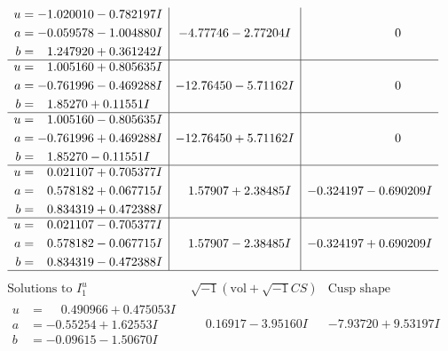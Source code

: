 \documentclass[1p]{elsarticle_modified}
\theoremstyle{definition}
\newcommand{\I}{\sqrt{-1}}
\begin{document}
$$\begin{array}{c|c|c}
\begin{aligned}
u &= -1.020010 - 0.782197 I \\
a &= -0.059578 - 1.004880 I \\
b &= \phantom{-}1.247920 + 0.361242 I\end{aligned}
 & -4.77746 - 2.77204 I & \phantom{-0.000000 } 0 \\ \hline\begin{aligned}
u &= \phantom{-}1.005160 + 0.805635 I \\
a &= -0.761996 - 0.469288 I \\
b &= \phantom{-}1.85270 + 0.11551 I\end{aligned}
 & -12.76450 - 5.71162 I & \phantom{-0.000000 } 0 \\ \hline\begin{aligned}
u &= \phantom{-}1.005160 - 0.805635 I \\
a &= -0.761996 + 0.469288 I \\
b &= \phantom{-}1.85270 - 0.11551 I\end{aligned}
 & -12.76450 + 5.71162 I & \phantom{-0.000000 } 0 \\ \hline\begin{aligned}
u &= \phantom{-}0.021107 + 0.705377 I \\
a &= \phantom{-}0.578182 + 0.067715 I \\
b &= \phantom{-}0.834319 + 0.472388 I\end{aligned}
 & \phantom{-}1.57907 + 2.38485 I & -0.324197 - 0.690209 I \\ \hline\begin{aligned}
u &= \phantom{-}0.021107 - 0.705377 I \\
a &= \phantom{-}0.578182 - 0.067715 I \\
b &= \phantom{-}0.834319 - 0.472388 I\end{aligned}
 & \phantom{-}1.57907 - 2.38485 I & -0.324197 + 0.690209 I\\
 \hline 
 \end{array}$$\newpage$$\begin{array}{c|c|c}  
\text{Solutions to }I^u_{1}& \I (\text{vol} + \sqrt{-1}CS) & \text{Cusp shape}\\
 \hline 
\begin{aligned}
u &= \phantom{-}0.490966 + 0.475053 I \\
a &= -0.55254 + 1.62553 I \\
b &= -0.09615 - 1.50670 I\end{aligned}
 & \phantom{-}0.16917 - 3.95160 I & -7.93720 + 9.53197 I \\ \hline\begin{aligned}

\end{aligned}
\end{array}$$
\end{document}
